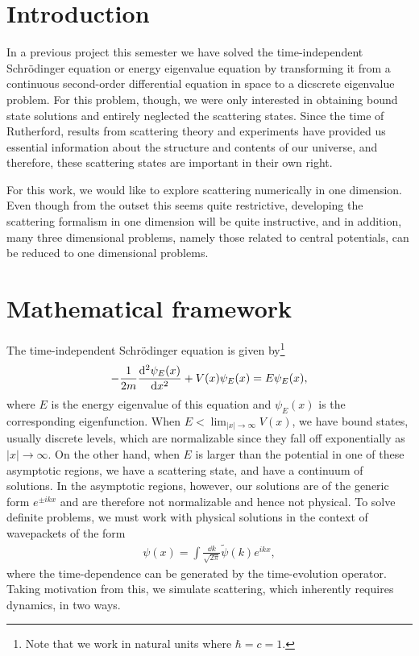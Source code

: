 
\def\HWnum{Final Project}
\def\duedate{December 9, 2024}




\section{Introduction}
\label{sec:introduction}

In a previous project this semester we have solved the time-independent Schr\"{o}dinger equation or energy eigenvalue equation by transforming it from a continuous second-order differential equation in space to a dicscrete eigenvalue problem.
For this problem, though, we were only interested in obtaining bound state solutions and entirely neglected the scattering states.
Since the time of Rutherford, results from scattering theory and experiments have provided us essential information about the structure and contents of our universe, and therefore, these scattering states are important in their own right.

For this work, we would like to explore scattering numerically in one dimension.
Even though from the outset this seems quite restrictive, developing the scattering formalism in one dimension will be quite instructive, and in addition, many three dimensional problems, namely those related to central potentials, can be reduced to one dimensional problems.

\section{Mathematical framework}
\label{sec:mathematical-framework}


The time-independent Schr\"{o}dinger equation is given by\footnote{Note that we work in natural units where $\hbar = c = 1$.}
\begin{align}
    -\frac{1}{2m} \dv[2]{\psi_{E}(x)}{x} + V(x) \psi_{E}(x) = E \psi_{E}(x)
,\end{align}
where $E$ is the energy eigenvalue of this equation and $\psi_{E}(x)$ is the corresponding eigenfunction.
When $E < \lim_{|x| \rightarrow \infty} V(x)$, we have bound states, usually discrete levels, which are normalizable since they fall off exponentially as $|x| \rightarrow \infty$.
On the other hand, when $E$ is larger than the potential in one of these asymptotic regions, we have a scattering state, and have a continuum of solutions.
In the asymptotic regions, however, our solutions are of the generic form $e^{\pm i k x}$ and are therefore not normalizable and hence not physical.
To solve definite problems, we must work with physical solutions in the context of wavepackets of the form
\begin{align}
    \psi(x) = \int \frac{\dd{k}}{\sqrt{2 \pi}} \widetilde{\psi}(k) e^{i k x}
,\end{align}
where the time-dependence can be generated by the time-evolution operator.
Taking motivation from this, we simulate scattering, which inherently requires dynamics, in two ways. 

